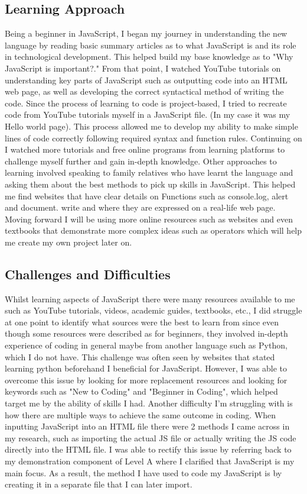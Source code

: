 \documentclass[a4paper, 11pt]{report}
\begin{document}
\subsection{Learning Approach}
Being a beginner in JavaScript, I began my journey in understanding the new language by reading basic summary articles as to what JavaScript is and its role in technological development.  This helped build my base knowledge as to "Why JavaScript is important?." From that point, I watched YouTube tutorials on understanding key parts of JavaScript such as outputting code into an HTML web page, as well as developing the correct syntactical method of writing the code. Since the process of learning to code is project-based, I tried to recreate code from YouTube tutorials myself in a JavaScript file. (In my case it was my Hello world page). This process allowed me to develop my ability to make simple lines of code correctly following required syntax and function rules. Continuing on I watched more tutorials and free online programs from learning platforms to challenge myself further and gain in-depth knowledge. Other approaches to learning involved speaking to family relatives who have learnt the language and asking them about the best methods to pick up skills in JavaScript. This helped me find websites that have clear details on Functions such as console.log, alert and document. write and where they are expressed on a real-life web page. Moving forward I will be using more online resources such as websites and even textbooks that demonstrate more complex ideas such as operators which will help me create my own project later on.   

\subsection{Challenges and Difficulties}
Whilst learning aspects of JavaScript there were many resources available to me such as YouTube tutorials, videos, academic guides, textbooks, etc., I did struggle at one point to identify what sources were the best to learn from since even though some resources were described as for beginners, they involved in-depth experience of coding in general maybe from another language such as Python, which I do not have. This challenge was often seen by websites that stated learning python beforehand I beneficial for JavaScript. However, I was able to overcome this issue by looking for more replacement resources and looking for keywords such as "New to Coding" and "Beginner in Coding", which helped target me by the ability of skills I had. Another difficulty I'm struggling with is how there are multiple ways to achieve the same outcome in coding. When inputting JavaScript into an HTML file there were 2 methods I came across in my research, such as importing the actual JS file or actually writing the JS code directly into the HTML file. I was able to rectify this issue by referring back to my demonstration component of Level A where I clarified that JavaScript is my main focus. As a result, the method I have used to code my JavaScript is by creating it in a separate file that I can later import.
\end{document}
